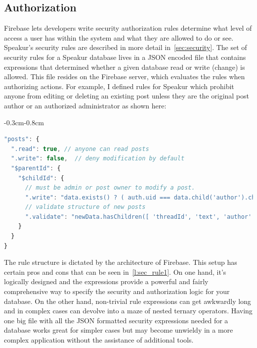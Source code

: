\subsection{Authorization}
Firebase lets developers write security authorization rules determine what level of access a user has within the system and what they are allowed to do or see.
Speakur's security rules are described in more detail in~\cref{sec:security}.
The set of security rules for a Speakur database lives in a JSON encoded file that contains expressions that determined whether a given database read or write (change) is allowed. 
This file resides on the Firebase server, which evaluates the rules when authorizing actions.
For example, I defined rules for Speakur which prohibit anyone from editing or deleting an existing post unless they are the original post author or an authorized administrator as shown here:

\begin{changemargin}{-0.3cm}{-0.8cm}
\begin{lstlisting}[language=JavaScript,caption=
{Security rules for the \tcode{posts} table (user messages).},label=l:sec_rule1,captionpos=below]
"posts": {
  ".read": true, // anyone can read posts
  ".write": false,  // deny modification by default
  "$parentId": {
    "$childId": {
      // must be admin or post owner to modify a post.
      ".write": "data.exists() ? ( auth.uid === data.child('author').child('uid').val() || root.child('admins').child(auth.uid).child('scope').val() === '*' ) : true",
      // validate structure of new posts
      ".validate": "newData.hasChildren([ 'threadId', 'text', 'author' ]) && newData.child('timestamp').val() > 1"
    }
  }
}
\end{lstlisting}
\end{changemargin}

The rule structure is dictated by the architecture of Firebase.
This setup has certain pros and cons that can be seen in~\cref{l:sec_rule1}. 
On one hand, it's logically designed and the expressions provide a powerful and fairly comprehensive way to specify the 
security and authorization logic for your database.
On the other hand, non-trivial rule expressions can get awkwardly long and in complex cases can devolve into a maze of nested ternary operators.
Having one big file with all the JSON formatted security expressions needed for a database works great for simpler cases but may become unwieldy in a more complex application without the assistance of additional tools.

